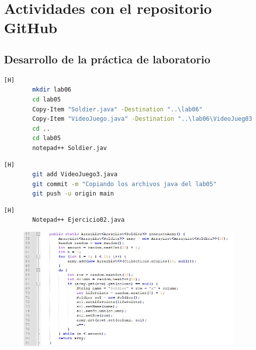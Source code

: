 \documentclass{article}
\begin{document}
	\section{Actividades con el repositorio GitHub}
	
	\subsection{Desarrollo de la práctica de laboratorio}
	
	\begin{lstlisting}[language=bash,caption={Inicializando el espacio de trabajo}][H]
		mkdir lab06
		cd lab05
		Copy-Item "Soldier.java" -Destination "..\lab06"
		Copy-Item "VideoJuego.java" -Destination "..\lab06\VideoJueg03.java"
		cd ..
		cd lab05
		notepad++ Soldier.jav
	\end{lstlisting}
	
	\begin{lstlisting}[language=bash,caption={Commit: Copiando los archivos java del lab05 }][H]
		git add VideoJuego3.java
		git commit -m "Copiando los archivos java del lab05"			
		git push -u origin main
	\end{lstlisting}
	
	\begin{lstlisting}[language=bash,caption={Se implementa un método que genera un ArrayList bidimensional de Soldier }][H]
		Notepad++ Ejercicio02.java
	\end{lstlisting}
	\begin{figure}[H]
		\centering
		\includegraphics[width=1\textwidth,keepaspectratio]{img/1.jpg}
	\end{figure}
	
\end{document}
